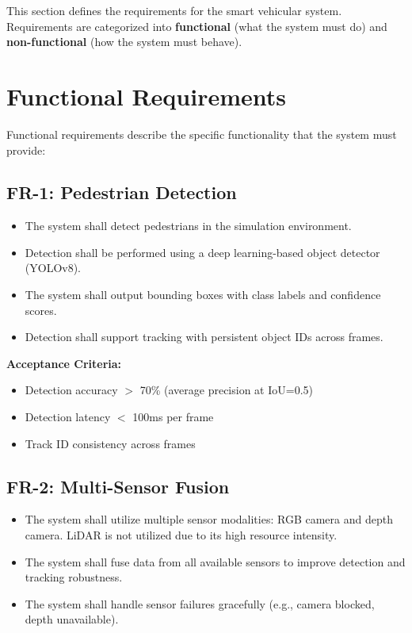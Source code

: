 This section defines the requirements for the smart vehicular system. Requirements are categorized into \textbf{functional} (what the system must do) and \textbf{non-functional} (how the system must behave).

\section{Functional Requirements}

Functional requirements describe the specific functionality that the system must provide:

\subsection{FR-1: Pedestrian Detection}

\begin{itemize}
    \item The system shall detect pedestrians in the simulation environment.
    \item Detection shall be performed using a deep learning-based object detector (YOLOv8).
    \item The system shall output bounding boxes with class labels and confidence scores.
    \item Detection shall support tracking with persistent object IDs across frames.
\end{itemize}

\textbf{Acceptance Criteria:}
\begin{itemize}
    \item Detection accuracy $ > $ 70\% (average precision at IoU=0.5)
    \item Detection latency $ < $ 100ms per frame
    \item Track ID consistency across frames
\end{itemize}

\subsection{FR-2: Multi-Sensor Fusion}

\begin{itemize}
    \item The system shall utilize multiple sensor modalities: RGB camera and depth camera. LiDAR is not utilized due to its high resource intensity.
    \item The system shall fuse data from all available sensors to improve detection and tracking robustness.
    \item The system shall handle sensor failures gracefully (e.g., camera blocked, depth unavailable).
\end{itemize}

